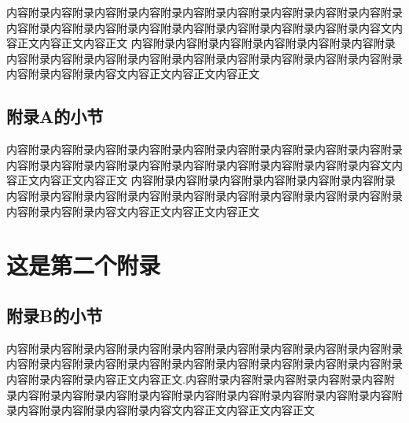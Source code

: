 \documentclass[UTF8,openany,twoside,12pt]{book}
\theoremstyle{plain}
\begin{document}
内容附录内容附录内容附录内容附录内容附录内容附录内容附录内容附录内容附录内容附录内容附录内容附录内容附录内容附录内容附录内容附录内容附录内容文内容正文内容正文内容正文
内容附录内容附录内容附录内容附录内容附录内容附录内容附录内容附录内容附录内容附录内容附录内容附录内容附录内容附录内容附录内容附录内容附录内容文内容正文内容正文内容正文

\clearpage
\section{附录A的小节}

内容附录内容附录内容附录内容附录内容附录内容附录内容附录内容附录内容附录内容附录内容附录内容附录内容附录内容附录内容附录内容附录内容附录内容文内容正文内容正文内容正文
内容附录内容附录内容附录内容附录内容附录内容附录内容附录内容附录内容附录内容附录内容附录内容附录内容附录内容附录内容附录内容附录内容附录内容文内容正文内容正文内容正文

\chapter{这是第二个附录}
\section{附录B的小节}


内容附录内容附录内容附录内容附录内容附录内容附录内容附录内容附录内容附录内容附录内容附录内容附录内容附录内容附录内容附录内容附录内容附录内容附录内容附录内容附录内容正文内容正文.内容附录内容附录内容附录内容附录内容附录内容附录内容附录内容附录内容附录内容附录内容附录内容附录内容附录内容附录内容附录内容附录内容附录内容文内容正文内容正文内容正文




\backmatter  %



\renewcommand{\bibname}{参考文献}

\clearpage
{}
{} %


\end{document}
